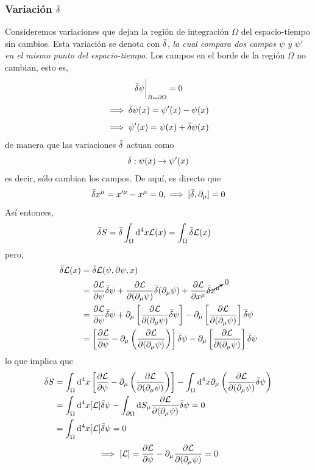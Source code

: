 \subsubsection{Variación $\bar{\delta}$}
Consideremos variaciones que dejan la región de integración $\Omega$ del espacio-tiempo sin cambios. Esta variación se denota con $\bar{\delta}$, \textit{la cual compara dos campos $\psi$ y $\psi'$ en el mismo punto del espacio-tiempo}. Los campos en el borde de la región $\Omega$ no cambian, esto es,
\begin{equation}
  \eval{\db\psi}_{B=\partial\Omega}=0
\end{equation}
\begin{equation}
  \implies \bar{\delta}\psi(x)=\psi'(x)-\psi(x)
\end{equation}
\begin{equation}
  \implies \psi'(x)=\psi(x)+\bar{\delta}\psi(x)
\end{equation}
de manera que las variaciones $\bar{\delta}$ actuan como
\begin{equation}
  \bar{\delta} : \psi(x)\to \psi'(x)
\end{equation}
es decir, sólo cambian los campos. De aquí, es directo que
\begin{equation}
  \bar{\delta} x^\mu =x'^\mu -x^\mu =0,\implies [\bar{\delta}, \partial_\mu ]=0
\end{equation}
Así entonces,
\begin{align}
  \bar{\delta} S&=\bar{\delta} \int_\Omega\dd^4x\mathcal{L}(x)=\int_\Omega\bar{\delta} \mathcal{L}(x)
\end{align}
pero,
\begin{align}
  \bar{\delta} \mathcal{L}(x)&=\bar{\delta} \mathcal{L}(\psi,\partial\psi,x)\\
  &=\pdv{\mathcal{L}}{\psi}\bar{\delta} \psi +\pdv{\mathcal{L}}{(\partial_\mu\psi)}\bar{\delta} (\partial_\mu \psi)+\pdv{\mathcal{L}}{x^\mu}\cancelto{0}{\bar{\delta} x^\mu }\\
  &=\pdv{\mathcal{L}}{\psi}\bar{\delta} \psi+\partial_\mu \left[\pdv{\mathcal{L}}{(\partial_\mu\psi)}\bar{\delta} \psi\right]-\partial_\mu \left[\pdv{\mathcal{L}}{(\partial_\mu\psi)}\right]\bar{\delta}\psi\\
  &=\left[\pdv{\mathcal{L}}{\psi}-\partial_\mu \left(\pdv{\mathcal{L}}{(\partial_\mu\psi)}\right)\right]\bar{\delta}\psi -\partial_\mu \left[\pdv{\mathcal{L}}{(\partial_\mu\psi)}\right]\bar{\delta}\psi
\end{align}
lo que implica que
\begin{align}
  \bar{\delta} S&=\int_\Omega\dd^4x \left[\pdv{\mathcal{L}}{\psi}-\partial_\mu \left(\pdv{\mathcal{L}}{(\partial_\mu\psi)}\right)\right]-\int_\Omega\dd^4x \partial_\mu \left(\pdv{\mathcal{L}}{(\partial_\mu\psi)}\bar{\delta} \psi \right)\\
  &=\int_\Omega\dd^4x [\mathcal{L}]\bar{\delta}\psi -\int_{\partial\Omega}\dd S_\mu \pdv{\mathcal{L}}{(\partial_\mu\psi)}\bar{\delta} \psi=0\\
  &=\int_\Omega\dd^4x [\mathcal{L}]\bar{\delta}\psi=0
\end{align}
\begin{equation}
  \implies [\mathcal{L}]=\pdv{\mathcal{L}}{\psi}-\partial_\mu \pdv{\mathcal{L}}{(\partial_\mu\psi)}=0
\end{equation}


